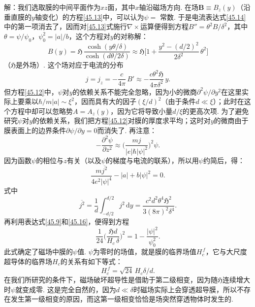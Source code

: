 \begin{xiti}
{\heiti 解：}我们选取膜的中间平面作为$xz$面，其中$x$轴沿磁场方向. 在场$\bm B\equiv B_z(y)$（沿垂直膜的$y$轴变化）的方程\eqref{45.13}中，可以认为$\psi=$ 常数. 于是电流表达式\eqref{45.14}中的第一项消去了，因而对\eqref{45.13}式施行$\nabla\times$运算便得到方程$B''=\theta^2B/\delta^2$，其中$\theta=\psi/\psi_0$，$\psi_0^2=|a|/b$，这个方程对$y$的对称解：
\begin{equation*}
B(y) = \pmb{\mathfrak H}\,\frac{\cosh(y\theta/\delta)}{\cosh(d\theta/2\delta)}
\approx \pmb{\mathfrak H}\Biggl[1 + \frac{y^2-(d/2)^2}{2\delta^2}\,\theta^2\Biggr]
\end{equation*}
（$\pmb{\mathfrak H}$是外场）. 这个场对应于电流的分布
\begin{equation*}
j = j_z = -\frac{c}{4\pi}\,B' \approx -\frac{c\theta^2\mathfrak H}{4\pi\delta^2}\,y.
\end{equation*}
但方程\eqref{45.12}中，$\psi$对$y$的依赖关系不能完全忽略，因为小的微商$\partial^2\psi/\partial y^2$在这里实际上要乘以$\hbar/m|a|\sim\xi^2$，因而具有大的因子$(\xi/d)^2$（由于条件$d\ll\xi$）；此时在这个方程中却可以忽略势$A=A_z(y)$，因为它将导致小量$d/\xi$的更高次项. 为了避免研究$\psi$对$y$的依赖关系，我们把方程\eqref{45.12}对膜的厚度求平均；这时对$y$的微商由于膜表面上的边界条件$\partial\psi/\partial y=0$而消失了. 再注意：
\begin{equation*}
-\frac{\partial^2\psi}{\partial z^2} \approx \Biggl(\frac{mj}{|e|\hbar|\psi|^2}\Biggr)^2\psi.
\end{equation*}
因为函数$\psi$的相位与$z$有关（以及$\psi$的梯度与电流的联系），所以用$\psi$约简后，得：
\begin{equation*}
\frac{m\overline{j^2}}{4e^2|\psi|^4} - |a| + b|\psi|^2 = 0.
\end{equation*}
式中
\begin{equation*}
\overline{j^2} = \frac{1}{d}\int_{-d/2}^{d/2}j^2\,\mathrm dy
= \frac{c^2d^2\theta^4\mathfrak H^2}{3(8\pi)^2\delta^4}.
\end{equation*}
再利用表达式\eqref{45.9}和\eqref{45.16}，便得到方程
\begin{equation*}
\frac{1}{24}\Biggl(\frac{\mathfrak H d}{H_c\,\delta}\Biggr)^2 = 1 - \frac{|\psi|^2}{\psi_0^2}.
\end{equation*}
此式确定了磁场中膜的$\psi$值. $\psi$为零时的场值，就是膜的临界场值$H_c^{\,f}$，它与大尺度超导体的临界场$H_c$的关系有如下等式：
\begin{equation*}
H_c^{\,f} = \sqrt{24}\,H_c\delta/d.
\end{equation*}
在我们所研究的条件下，磁场破坏超导性是借助于第二级相变，因为随$\pmb{\mathfrak H}$连续增大时$\psi$就变成零. 这是完全自然的，因为$d\ll\delta$时磁场实际上会穿透超导膜，所以不存在发生第一级相变的原因，而这第一级相变恰恰是场突然穿透物体时发生的.

\end{xiti}
